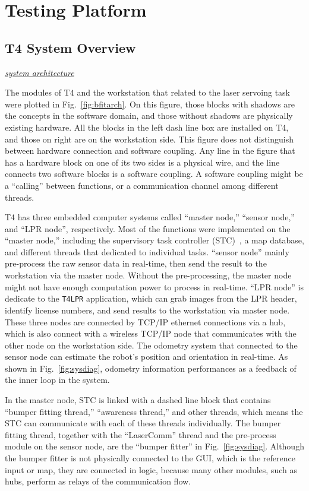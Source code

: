 \documentclass[]{spie}
\newcounter{cmt}
\newcommand{\showcom}{no} %
\def\t4lpr{\texttt{T4LPR}}
\newcommand{\com}[1]{\ifthenelse{\equal{\showcom}{yes}}
    { \noindent{\quad\raisebox{0.5em}{\fbox{\stepcounter{cmt} \texttt{\footnotesize Comment \arabic{cmt}}}}}
        \underline{\underline{\textsl{#1}}} \index{Comment List!\arabic{cmt}#1}}
    {}
}
\begin{document}
\section{Testing Platform}\label{sec:plat}

\subsection{T4 System Overview}
\com{system architecture}
    The modules of T4 and the workstation that related to the laser servoing task were plotted in Fig.~\ref{fig:bfitarch}. On this figure, those blocks with shadows are the concepts in the software domain, and those without shadows are physically existing hardware. All the blocks in the left dash line box are installed on T4, and those on right are on the workstation side. This figure does not distinguish between hardware connection and software coupling. Any line in the figure that has a hardware block on one of its two sides is a physical wire, and the line connects two software blocks is a software coupling. A software coupling might be a ``calling'' between functions, or a communication channel among different threads.

    T4 has three embedded computer systems called ``master node,'' ``sensor node,'' and ``LPR node'', respectively. Most of the functions were implemented on the ``master node,'' including the supervisory task controller (STC)~\cite{Shah02}, a map database, and different threads that dedicated to individual tasks. ``sensor node'' mainly pre-process the raw sensor data in real-time, then send the result to the workstation via the master node. Without the pre-processing, the master node might not have enough computation power to process in real-time. ``LPR node'' is dedicate to the \t4lpr application, which can grab images from the LPR header, identify license numbers, and send results to the workstation via master node. These three nodes are connected by TCP/IP ethernet connections via a hub, which is also connect with a wireless TCP/IP node that communicates with the other node on the workstation side. The odometry system that connected to the sensor node can estimate the robot's position and orientation in real-time. As shown in Fig.~\ref{fig:sysdiag}, odometry information performances as a feedback of the inner loop in the system.

    In the master node, STC is linked with a dashed line block that contains ``bumper fitting thread,'' ``awareness thread,'' and other threads, which means the STC can communicate with each of these threads individually. The bumper fitting thread, together with the ``LaserComm'' thread and the pre-process module on the sensor node, are the ``bumper fitter'' in Fig.~\ref{fig:sysdiag}. Although the bumper fitter is not physically connected to the GUI, which is the reference input or map, they are connected in logic, because many other modules, such as hubs, perform as relays of the communication flow.
\end{document}
